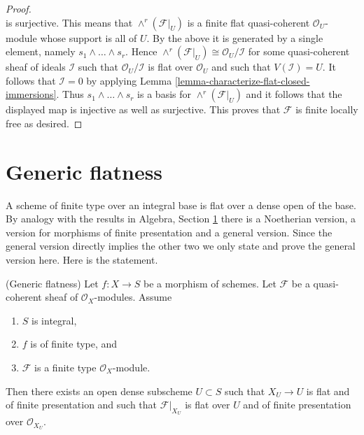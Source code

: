 \begin{proof}
$$$$
is surjective. This means that
$\wedge^r(\mathcal{F}|_U)$ is a finite flat quasi-coherent
$\mathcal{O}_U$-module whose support is all of $U$.
By the above it is generated by a single element, namely
$s_1 \wedge \ldots \wedge s_r$. Hence
$\wedge^r(\mathcal{F}|_U) \cong \mathcal{O}_U/\mathcal{I}$
for some quasi-coherent sheaf of ideals $\mathcal{I}$
such that $\mathcal{O}_U/\mathcal{I}$ is flat over $\mathcal{O}_U$ and
such that $V(\mathcal{I}) = U$.
It follows that $\mathcal{I} = 0$ by applying
Lemma \ref{lemma-characterize-flat-closed-immersions}.
Thus $s_1 \wedge \ldots \wedge s_r$ is a basis for
$\wedge^r(\mathcal{F}|_U)$ and it follows that the displayed map is injective
as well as surjective. This proves that $\mathcal{F}$ is finite locally free
as desired.
\end{proof}






\section{Generic flatness}
\label{section-generic-flatness}

\noindent
A scheme of finite type over an integral base is flat over a dense
open of the base. By analogy with the results in
Algebra, Section \ref{section-generic-flatness}
there is a Noetherian version, a version for morphisms of finite presentation
and a general version. Since the general version directly implies the other
two we only state and prove the general version here.
Here is the statement.

\begin{proposition}
\label{proposition-generic-flatness}
(Generic flatness)
Let $f : X \to S$ be a morphism of schemes.
Let $\mathcal{F}$ be a quasi-coherent sheaf of $\mathcal{O}_X$-modules.
Assume
\begin{enumerate}
\item $S$ is integral,
\item $f$ is of finite type, and
\item $\mathcal{F}$ is a finite type $\mathcal{O}_X$-module.
\end{enumerate}
Then there exists an open dense subscheme $U \subset S$ such that
$X_U \to U$ is flat and of finite presentation and such that
$\mathcal{F}|_{X_U}$ is flat over $U$ and of finite presentation
over $\mathcal{O}_{X_U}$.
\end{proposition}

